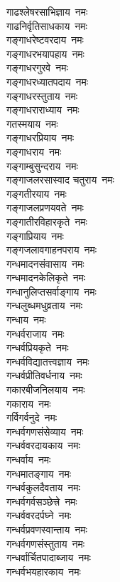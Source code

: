 \begin{multicols}{2}
\begin{flushleft}
गाढश्लेषरसाभिज्ञाय~नमः\\
गाढनिर्वृतिसाधकाय~नमः\hfill{}\\
गङ्गाधरेष्टवरदाय~नमः\\
गङ्गाधरभयापहाय~नमः\\
गङ्गाधरगुरवे~नमः\\
गङ्गाधरध्यातपदाय~नमः\\
गङ्गाधरस्तुताय~नमः\\
गङ्गाधराराध्याय~नमः\\
गतस्मयाय~नमः\\
गङ्गाधरप्रियाय~नमः\\
गङ्गाधराय~नमः\\
गङ्गाम्बुसुन्दराय~नमः\hfill{}\\
गङ्गाजलरसास्वाद चतुराय~नमः\\
गङ्गतीरयाय~नमः\\
गङ्गाजलप्रणयवते~नमः\\
गङ्गातीरविहारकृते~नमः\\
गङ्गाप्रियाय~नमः\\
गङ्गजलावगाहनपराय~नमः\\
गन्धमादनसंवासाय~नमः\\
गन्धमादनकेलिकृते~नमः\\
गन्धानुलिप्तसर्वाङ्गाय~नमः\\
गन्धलुब्धमधुव्रताय~नमः\hfill{}\\
गन्धाय~नमः\\
गन्धर्वराजाय~नमः\\
गन्धर्वप्रियकृते~नमः\\
गन्धर्वविद्यातत्त्वज्ञाय~नमः\\
गन्धर्वप्रीतिवर्धनाय~नमः\\
गकारबीजनिलयाय~नमः\\
गकाराय~नमः\\
गर्विगर्वनुदे~नमः\\
गन्धर्वगणसंसेव्याय~नमः\\
गन्धर्ववरदायकाय~नमः\hfill{}\\
गन्धर्वाय~नमः\\
गन्धमातङ्गाय~नमः\\
गन्धर्वकुलदैवताय~नमः\\
गन्धर्वगर्वसञ्छेत्त्रे~नमः\\
गन्धर्ववरदर्पघ्ने~नमः\\
गन्धर्वप्रवणस्वान्ताय~नमः\\
गन्धर्वगणसंस्तुताय~नमः\\
गन्धर्वार्चितपादाब्जाय~नमः\\
गन्धर्वभयहारकाय~नमः\\

\end{flushleft}
\end{multicols}
